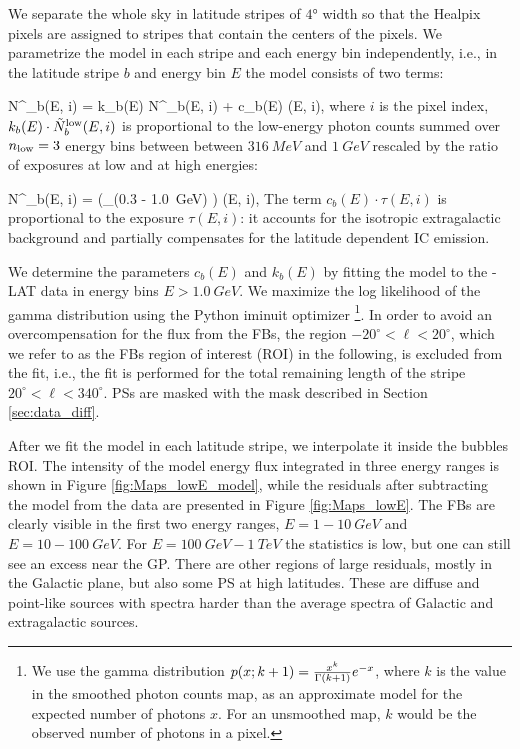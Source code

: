 We separate the whole sky in latitude stripes of $\ang{4}$ width so that the Healpix pixels are assigned to stripes that contain the centers of the pixels.
We parametrize the model in each stripe and each energy bin independently, i.e., 
in the latitude stripe $b$ and energy bin $E$ the model consists of two terms:

\be
N^\model_{b}(E, i) = k_{b}(E) \cdot \tilde N^\low_{b}(E, i) + c_b(E) \cdot \tau(E, i),
\ee
where $i$ is the pixel index,
$k_{b}(E) \cdot \tilde N^{\text{low}}_b(E, i)$ is proportional to the low-energy photon counts summed over 
$n_{\text{low}} = 3$ energy bins between between $\SI{316}{MeV}$ and $\SI{1}{GeV}$ 
rescaled by the ratio of exposures at low and at high energies:

\be
\tilde N^\low_b(E, i) =  \left(\sum_{\epsilon \in (0.3 - \SI{1.0}{GeV})} \right) \cdot \tau(E, i),
\ee
The term $c_b(E) \cdot \tau(E, i)$ is proportional to the exposure $\tau(E, i)$: it accounts for the isotropic extragalactic background and partially compensates for the latitude dependent IC emission. 

We determine the parameters $c_{b}(E)$ and $k_{b}(E)$ by fitting the model to the \Fermi-LAT data in energy bins $E > \SI{1.0}{GeV}$.
We maximize the log likelihood of the gamma distribution using the Python iminuit optimizer%
\footnote{We use the gamma distribution $p(x; k + 1) = \frac{x^k}{\Gamma (k + 1)}e^{-x}$, where $k$ is the value in the smoothed photon counts map,
as an approximate model for the expected number of photons $x$.
For an unsmoothed map, $k$ would be the observed number of photons in a pixel.
}.
In order to avoid an overcompensation 
for the flux from the FBs, the region $-20^\circ < \ell < 20^\circ$, which we refer to as the FBs region of interest (ROI) in the following,
is excluded from the fit, i.e., the fit is performed for 
the total remaining length of the stripe $20^\circ < \ell < 340^\circ$.
PSs are masked with the mask described in Section \ref{sec:data_diff}.


After we fit the model in each latitude stripe, we interpolate it inside the bubbles ROI.
The intensity of the model energy flux integrated in three energy ranges
is shown in Figure \ref{fig:Maps_lowE_model},
while the residuals after subtracting the model from the data are presented in Figure \ref{fig:Maps_lowE}.
The FBs are clearly visible in the first two energy ranges, $E = 1 - \SI{10}{GeV}$ and $E = 10 - \SI{100}{GeV}$.
For $E = \SI{100}{GeV} - \SI{1}{TeV}$ the statistics is low, but one can still see an excess near the GP.
There are other regions of large residuals, mostly in the Galactic plane, but also some PS at high latitudes.
These are diffuse and point-like sources with spectra harder than the average spectra of Galactic and
extragalactic sources.

